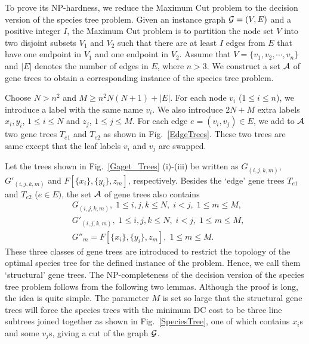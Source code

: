 \documentclass[9.5pt,journal,letterpaper,compsoc]{IEEEtran}
\begin{document}
 To prove its NP-hardness, we reduce the Maximum Cut problem to the
 decision version of the species tree problem. Given an instance
 graph ${\cal G}=(V, E)$ and
a positive integer $I$,  the Maximum
 Cut problem is to partition the node set $V$ into two disjoint
 subsets $V_1$ and
 $V_2$ such that there are at least $I$  edges from $E$ that have one
 endpoint in $V_1$ and one endpoint in $V_2$.  Assume
 that $V=\{v_1, v_2, \cdots, v_n\}$ and $|E|$ denotes the number of
 edges in $E$, where $n>3$. We construct a
 set $\cal A$ of gene trees to obtain a corresponding instance of the
 species tree problem.



 Choose  $N>n^2$ and $M\geq n^2N(N+1)+ |E|$.
 For each node $v_i$ ($1\leq i\leq n$), we introduce a label with the same
name $v_i$. We
 also introduce $2N+M$ extra labels $x_i, y_i$, $1\leq i\leq N$ and $z_j$, $1\leq j\leq M$.
 For each edge $e=(v_i, v_j) \in E$, we add to $\cal A$ two gene trees $T_{e1}$ and
 $T_{e2}$ as shown in Fig.~\ref{EdgeTrees}.
These two trees are same except that  the leaf labels $v_i$ and  $v_{j}$ are
swapped.



 Let the trees shown in Fig.~\ref{Gaget_Trees} (i)-(iii) be written as
 $G_{(i, j, k, m)}$,  $G'_{(i, j, k, m)}$
 and $F[\{x_i\},\{y_i\}, z_m]$, respectively. Besides the `edge' gene trees $T_{e1}$
and $T_{e2}$ ($e\in E)$, the set $\cal A$ of gene trees  also
contains
 \begin{eqnarray*}
   & G_{(i, j, k, m)}, \;1\leq i, j, k \leq N,\;i<j, \; 1\leq m\leq M,\\
   &G'_{(i, j, k, m)}, \;1\leq i, j, k \leq N,\;i<j, \; 1\leq m\leq M,\\
   &G''_{m}=F[\{x_i\},\{y_i\}, z_m],\; 1\leq m\leq M.
 \end{eqnarray*}
These three classes of gene trees are introduced to restrict the
topology of the optimal species tree for the defined instance of the
problem. Hence, we call them `structural' gene trees.
 The NP-completeness of the decision version of the species tree problem
follows from the following two lemmas. Although the proof is long,
the idea is quite simple. The parameter $M$ is set so large that the
structural gene trees will force the species trees with the minimum
DC cost to be three line subtrees joined together as shown in
Fig.~\ref{SpeciesTree},  one of which contains $x_i$s and some
$v_j$s, giving a cut of the graph $\cal G$.
\end{document}
